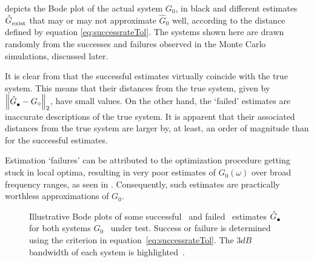   depicts the Bode plot of the actual system $G_0$, in black
 and different estimates $\model{exist}$
 that may or may not approximate $\hat{G}_{0}$ well, according to the distance defined by equation \eqref{eq:successrateTol}.
 The systems shown here are drawn randomly from the successes and failures observed in the Monte Carlo simulations, discussed later.
 
 It is clear from  that the successful estimates virtually coincide with the true system. This means 
that their distances from the true system, given by $\norm[2]{\model{\bullet} - \true{G}}$, have small values. 
On the other hand, the `failed' estimates are inaccurate descriptions of the true system. It is apparent that their associated distances from the true system are larger by, at least, an order of magnitude than for the successful estimates.
 
 Estimation `failures' can be attributed to the optimization procedure getting stuck in local optima, resulting in very poor estimates of $G_0(\omega)$ over broad frequency ranges, as seen in . 
 Consequently, such estimates are practically worthless approximations of $G_0$.


\begin{figure}
  \centering
  \setlength{\figurewidth}{0.8\columnwidth}
  \setlength{\figureheight}{0.6\figurewidth}
  
 \caption[Bodeplot of successful ad failed estimates.]{Illustrative Bode plots of some successful~ and failed~ estimates $\model{\bullet}$ for both systems $G_0$~ under test.
 Success or failure is determined using the criterion in equation~\eqref{eq:successrateTol}. The $3\unit{dB}$ bandwidth of each system is highlighted~.}
\label{fig:exampleFRF}
\end{figure}


